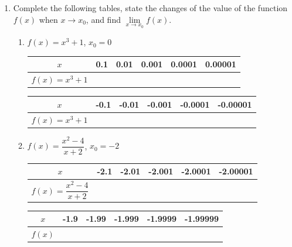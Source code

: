 \documentclass[12pt]{report}
\begin{document}
\begin{enumerate}
  \item Complete the following tables, state the changes of the value of the function
        $f (x)$ when $x \to x_0$, and find $\lim\limits_{x \to x_0} f (x)$.
        \begin{enumerate}
          \item $f (x) = x^3 + 1$, $x_0 = 0$
                \begin{center}
                  \begin{tabular}{|c|c|c|c|c|c|}
                    \hline
                    $x$               & 0.1 & 0.01 & 0.001 & 0.0001 & 0.00001 \\
                    \hline
                    $f (x) = x^3 + 1$ &     &      &       &        &         \\
                    \hline
                  \end{tabular}
                  \vskip 0.2cm
                  \begin{tabular}{|c|c|c|c|c|c|}
                    \hline
                    $x$               & -0.1 & -0.01 & -0.001 & -0.0001 & -0.00001 \\
                    \hline
                    $f (x) = x^3 + 1$ &      &       &        &         &          \\
                    \hline
                  \end{tabular}
                \end{center}

          \item $f (x) = \dfrac{x^2 - 4}{x + 2}$, $x_0 = -2$
                \begin{center}
                  \begin{tabular}{|c|c|c|c|c|c|}
                    \hline
                    $x$                              & -2.1 & -2.01 & -2.001 & -2.0001 & -2.00001 \\
                    \hline
                    $f (x) = \dfrac{x^2 - 4}{x + 2}$ &      &       &        &         &          \\
                    \hline
                  \end{tabular}
                  \vskip 0.2cm
                  \begin{tabular}{|c|c|c|c|c|c|}
                    \hline
                    $x$     & -1.9 & -1.99 & -1.999 & -1.9999 & -1.99999 \\
                    \hline
                    $f (x)$ &      &       &        &         &          \\
                    \hline
                  \end{tabular}
                \end{center}


\end{enumerate}
\end{enumerate}
\end{document}
